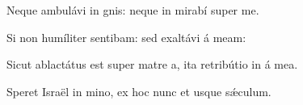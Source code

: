 \item {}

\item Neque ambulávi in gnis:\psstar{} neque in mirabí super me.

\item Si non humíliter sentibam:\psstar{} sed exaltávi á meam:

\item Sicut ablactátus est super matre a,\psstar{} ita retribútio in á mea.

\item Speret Israël in mino,\psstar{} ex hoc nunc et usque  sǽculum.
